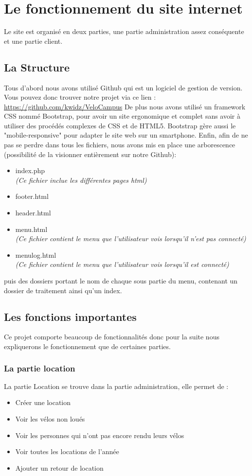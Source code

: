 \documentclass[11pt,a4paper,titlepage]{report}
\begin{document}
\chapter{Le fonctionnement du site internet}
Le site est organisé en deux parties, une partie administration assez conséquente et une partie client.
\section{La Structure}
Tous d'abord nous avons utilisé Github qui est un logiciel de gestion de version.
Vous pouvez donc trouver notre projet via ce lien :
\url{https://github.com/kwidz/VeloCampus}
De plus nous avons utilisé un framework CSS nommé Bootstrap, pour avoir un site ergonomique et complet sans avoir à utiliser des procédés complexes de CSS et de HTML5. Bootstrap gère aussi le "mobile-responsive" pour adapter le site web sur un smartphone.
Enfin, afin de ne pas se perdre dans tous les fichiers, nous avons mis en place une arborescence (possibilité de la visionner entièrement sur notre Github):
\begin{itemize}
\item index.php \\
\textit{(Ce fichier inclue les différentes pages html)}
\item footer.html
\item header.html
\item menu.html \\
\textit{(Ce fichier contient le menu que l'utilisateur vois lorsqu'il n'est pas connecté)}
\item menulog.html \\
\textit{(Ce fichier contient le menu que l'utilisateur vois lorsqu'il est connecté)}
\end{itemize}
 puis des dossiers portant le nom de chaque sous partie du menu, contenant un dossier de traitement ainsi qu'un index.
 
\section{Les fonctions importantes}
Ce projet comporte beaucoup de fonctionnalités donc pour la suite nous expliquerons le fonctionnement que de certaines parties.  
\subsection{La partie location}
La partie Location se trouve dans la partie administration, elle permet de : 
\begin{itemize}
\item Créer une location
\item Voir les vélos non loués
\item Voir les personnes qui n'ont pas encore rendu leurs vélos
\item Voir toutes les locations de l'année
\item Ajouter un retour de location 
\end{itemize}
\end{document}
